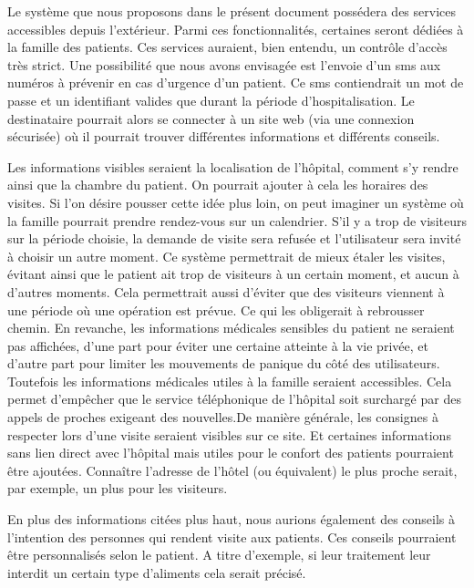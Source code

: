 Le système que nous proposons dans le présent document possédera des services accessibles depuis l'extérieur. Parmi ces
fonctionnalités, certaines seront dédiées à la famille des patients. Ces services auraient, bien entendu, un contrôle d'accès très
strict. Une possibilité que nous avons envisagée est l'envoie d'un sms aux numéros à prévenir en cas d'urgence d'un patient. Ce
sms contiendrait un mot de passe et un identifiant valides que durant la période d'hospitalisation. Le destinataire pourrait alors
se connecter à un site web (via une connexion sécurisée) où il pourrait trouver différentes informations et différents conseils.
\newline

Les informations visibles seraient la localisation de l'hôpital, comment s'y rendre ainsi que la chambre du patient. On pourrait
ajouter à cela les horaires des visites. Si l'on désire pousser cette idée plus loin, on peut imaginer un système où la famille
pourrait prendre rendez-vous sur un calendrier. S'il y a trop de visiteurs sur la période choisie, la demande de visite sera
refusée et l'utilisateur sera invité à choisir un autre moment. Ce système permettrait de mieux étaler les visites, évitant ainsi
que le patient ait trop de visiteurs à un certain moment, et aucun à d'autres moments. Cela permettrait aussi d'éviter que des
visiteurs viennent à une période où une opération est prévue. Ce qui les obligerait à rebrousser chemin. En revanche, les
informations médicales sensibles du patient ne seraient pas affichées, d'une part pour éviter une certaine atteinte à la vie
privée, et d'autre part pour limiter les mouvements de panique du côté des utilisateurs. Toutefois les informations médicales
utiles à la famille seraient accessibles. Cela permet d'empêcher que le service téléphonique de l'hôpital soit  surchargé par des
appels de proches exigeant des nouvelles.De manière générale, les consignes à respecter lors d'une visite seraient visibles sur
ce site. Et certaines informations sans lien direct avec l'hôpital mais utiles pour le confort des patients pourraient être
ajoutées. Connaître l'adresse de l'hôtel (ou équivalent) le plus proche serait, par exemple, un plus pour les visiteurs.
\newline

En plus des informations citées plus haut, nous aurions également des conseils à l'intention des personnes qui rendent visite aux
patients. Ces conseils pourraient être personnalisés selon le patient. A titre d'exemple, si leur traitement leur interdit un certain type d'aliments
cela serait précisé. 
\newline


